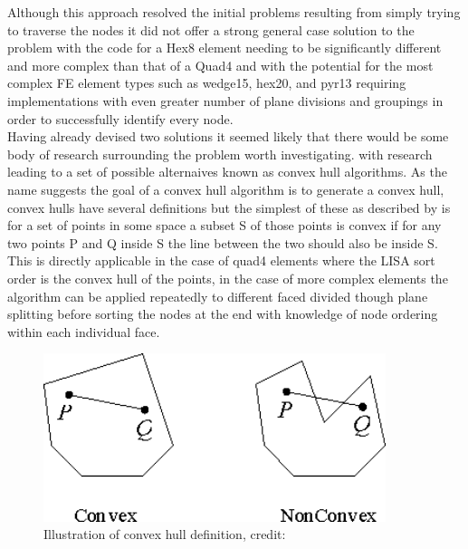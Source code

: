 \noindent
Although this approach resolved the initial problems resulting from simply trying to traverse the nodes it did not offer a strong general case solution to the problem with the code for a Hex8 element needing to be significantly different and more complex than that of a Quad4 and with the potential for the most complex FE element types such as wedge15, hex20, and pyr13 requiring implementations with even greater number of plane divisions and groupings in order to successfully identify every node. \\ 


\noindent
Having already devised two solutions it seemed likely that there would be some body of research surrounding the problem worth investigating. with research leading to a set of possible alternaives known as convex hull algorithms. As the name suggests the goal of a convex hull algorithm is to generate a convex hull, convex hulls have several definitions but the simplest of these as described by \cite{ConvexHulls} is for a set of points in some space a subset S of those points is convex if for any two points P and Q  inside S the line between the two should also be inside S. This is directly applicable in the case of quad4 elements where the LISA sort order is the convex hull of the points, in the case of more complex elements the algorithm can be applied repeatedly to different faced divided though plane splitting before sorting the nodes at the end with knowledge of node ordering within each individual face.

\begin{figure}[!h]
  \centerline{\includegraphics[width=100mm , scale=1]{../Graphics/ConvexHullGraphic.png}}
  \caption{Illustration of convex hull definition, credit: \cite{ConvexHulls}
  }
  \label{fig:h-refinementImp}
\end{figure}



